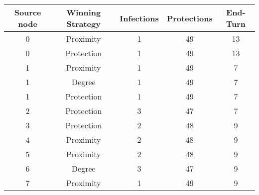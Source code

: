 \documentclass[results.tex]{subfiles}
\begin{document}
    \begin{center}
        \begin{tabular}{| c || c | c | c | c |}
            \hline
            {\bfseries Source node} & {\bfseries Winning Strategy} & {\bfseries Infections} & {\bfseries Protections}
            & {\bfseries End-Turn}
            \\  %
            \hline\hline
            0                       & Proximity                    & 1                      & 49                      & 13                   \\
            \hline
            0                       & Protection                   & 1                      & 49                      & 13                   \\
            \hline
            1                       & Proximity                    & 1                      & 49                      & 7                    \\
            \hline
            1                       & Degree                       & 1                      & 49                      & 7                    \\
            \hline
            1                       & Protection                   & 1                      & 49                      & 7                    \\
            \hline
            2                       & Protection                   & 3                      & 47                      & 7                    \\
            \hline
            3                       & Protection                   & 2                      & 48                      & 9                    \\
            \hline
            4                       & Proximity                    & 2                      & 48                      & 9                    \\
            \hline
            5                       & Proximity                    & 2                      & 48                      & 9                    \\
            \hline
            6                       & Degree                       & 3                      & 47                      & 9                    \\
            \hline
            7                       & Proximity                    & 1                      & 49                      & 9                    \\

\end{tabular}
\end{center}
\end{document}
